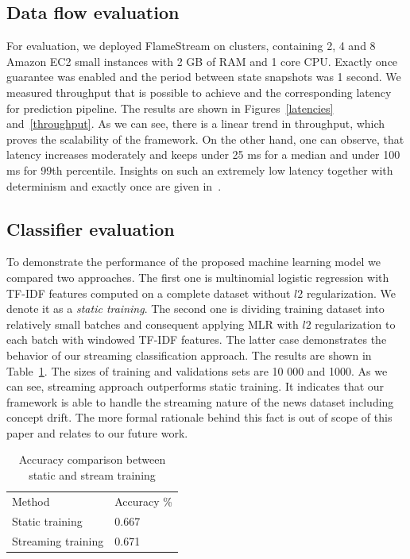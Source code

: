 \subsection{Data flow evaluation}

For evaluation, we deployed FlameStream on clusters, containing 2, 4 and 8 Amazon EC2 small instances with 2 GB of RAM and 1 core CPU. Exactly once guarantee was enabled and the period between state snapshots was 1 second. We measured throughput that is possible to achieve and the corresponding latency for prediction pipeline. The results are shown in Figures~\ref{latencies} and~\ref{throughput}. As we can see, there is a linear trend in throughput, which proves the scalability of the framework. On the other hand, one can observe, that latency increases moderately and keeps under 25 ms for a median and under 100 ms for 99th percentile. Insights on such an extremely low latency together with determinism and exactly once are given in~\cite{we2018beyondmr, we2018adbis}.

\subsection{Classifier evaluation}

To demonstrate the performance of the proposed machine learning model we compared two approaches. The first one is multinomial logistic regression with TF-IDF features computed on a complete dataset without $l2$ regularization. We denote it as a {\em static training}. The second one is dividing training dataset into relatively small batches and consequent applying MLR with $l2$ regularization to each batch with windowed TF-IDF features. The latter case demonstrates the behavior of our streaming classification approach. The results are shown in Table~\ref{accuracy}. The sizes of training and validations sets are 10 000 and 1000. As we can see, streaming approach outperforms static training. It indicates that our framework is able to handle the streaming nature of the news dataset including concept drift. The more formal rationale behind this fact is out of scope of this paper and relates to our future work.

\begin{table}[htbp]
\begin{tabular}{ll}
Method          & Accuracy \% \\
Static training  & 0.667          \\
Streaming training & 0.671         
\end{tabular}
\caption{Accuracy comparison between static and stream training}
\label{accuracy}
\end{table}